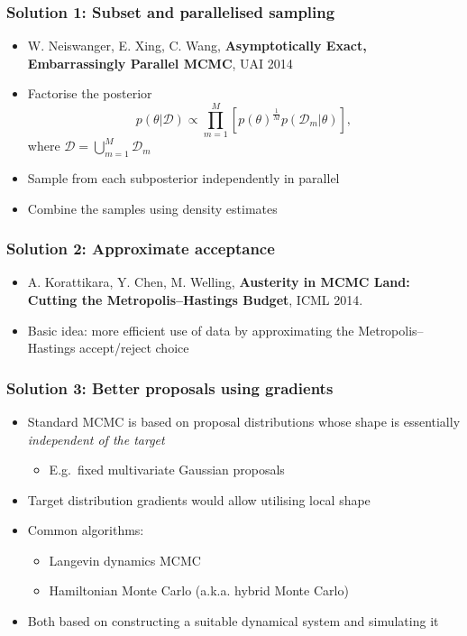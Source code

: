 \documentclass{beamer}
\newcommand{\dataset}{\mathcal{D}}
\newcommand{\parameters}{\theta}
\begin{document}
\begin{frame}
  \frametitle{Solution 1: Subset and parallelised sampling}

  \begin{itemize}
  \item W. Neiswanger, E. Xing, C. Wang, \textbf{Asymptotically Exact, Embarrassingly Parallel MCMC}, UAI 2014
  \end{itemize}

  \begin{itemize}
  \item Factorise the posterior
    $$ p(\parameters | \dataset) \propto \prod_{m=1}^M \left[ p(\parameters)^{\frac{1}{M}} p(\dataset_m | \parameters) \right], $$
    where $\dataset = \bigcup_{m=1}^M \dataset_m$
  \item Sample from each subposterior independently in parallel
  \item Combine the samples using density estimates
  \end{itemize}
\end{frame}

\begin{frame}
  \frametitle{Solution 2: Approximate acceptance}

  \begin{itemize}
  \item A. Korattikara, Y. Chen, M. Welling, \textbf{Austerity in MCMC Land: Cutting the Metropolis--Hastings Budget}, ICML 2014.
  \end{itemize}

  \begin{itemize}
  \item Basic idea: more efficient use of data by approximating the
    Metropolis--Hastings accept/reject choice
  \end{itemize}
\end{frame}

\begin{frame}
  \frametitle{Solution 3: Better proposals using gradients}

  \begin{itemize}
  \item Standard MCMC is based on proposal distributions whose shape is
    essentially \emph{independent of the target}
    \begin{itemize}
    \item E.g.~fixed multivariate Gaussian proposals
    \end{itemize}
  \item Target distribution gradients would allow utilising local shape
  \item Common algorithms:
    \begin{itemize}
    \item Langevin dynamics MCMC
    \item Hamiltonian Monte Carlo  (a.k.a. hybrid Monte Carlo)
    \end{itemize}
  \item Both based on constructing a suitable dynamical system and
    simulating it
  \end{itemize}
\end{frame}
\end{document}
